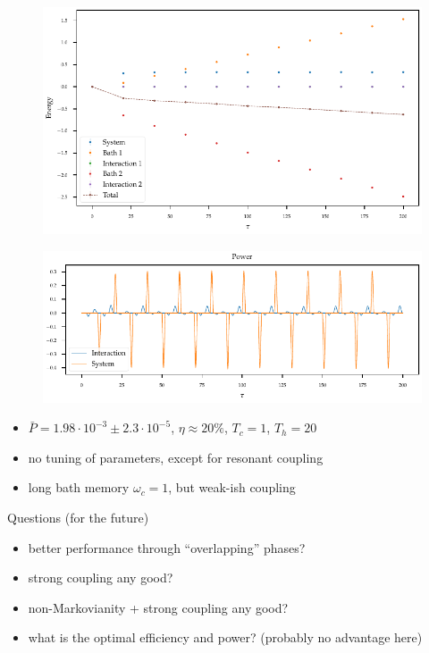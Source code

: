 \documentclass[10pt, aspectratio=169]{beamer}
\begin{document}
\begin{frame}
  \begin{figure}[h]
    \centering
    \includegraphics{figs/otto/energy_strobe}
  \end{figure}
\end{frame}
\begin{frame}
  \begin{figure}[h]
    \centering
    \includegraphics{figs/otto/power}
  \end{figure}
  \begin{itemize}
  \item \(\bar{P} = 1.98 \cdot 10^{-3} \pm 2.3 \cdot 10^{-5}\),
    \(η\approx 20\%\), \(T_{c}=1\), \(T_{h}=20\)
  \item no tuning of parameters, except for resonant coupling
  \item long bath memory \(ω_{c}=1\), but weak-ish coupling
  \end{itemize}
\end{frame}
\begin{frame}{Questions (for the future)}
  \begin{itemize}
  \item better performance through ``overlapping'' phases?
  \item strong coupling any good?
  \item non-Markovianity + strong coupling any good?
  \item what is the optimal efficiency and power? (probably no
    advantage here)
  \end{itemize}
\end{frame}
\end{document}
